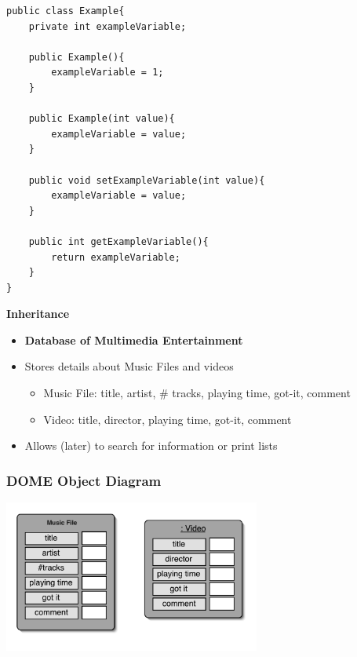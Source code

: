 \documentclass{beamer}
\begin{document}
\begin{frame}[fragile]
\small
\begin{block}{}
\begin{lstlisting}
public class Example{
	private int exampleVariable;
	
	public Example(){
		exampleVariable = 1;
	}
	
	public Example(int value){
		exampleVariable = value;
	}
	
	public void setExampleVariable(int value){
		exampleVariable = value;
	}
	
	public int getExampleVariable(){
		return exampleVariable;
	}
}
\end{lstlisting}
\end{block}
\end{frame}



\begin{frame}
\begin{center}
\textbf{Inheritance}
\end{center}
\end{frame}

\begin{frame}
\begin{itemize}
\item \textbf{Database of Multimedia Entertainment}
\item Stores details about Music Files and videos
\begin{itemize}
\item Music File: title, artist, \# tracks, playing time, got-it, comment
\item Video: title, director, playing time, got-it, comment
\end{itemize}
\item Allows (later) to search for information or print lists
\end{itemize}
\end{frame}

\begin{frame}
\frametitle{DOME Object Diagram}
\begin{center}
\includegraphics[height=5cm, keepaspectratio]{images/domeobjectdiagram}
\end{center}
\end{frame}
\end{document}
